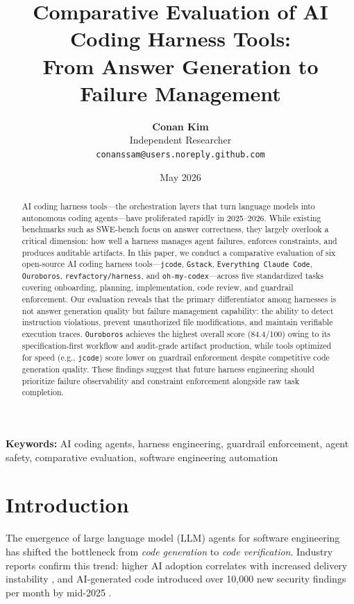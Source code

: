 \documentclass[11pt,a4paper]{article}
\title{\LARGE\bfseries Comparative Evaluation of AI Coding Harness Tools:\\[4pt]
\large From Answer Generation to Failure Management}
\author{
  \textbf{Conan Kim}\\[2pt]
  \small Independent Researcher\\
  \small \texttt{conanssam@users.noreply.github.com}
}
\date{May 2026}
\newcommand{\tool}[1]{\texttt{#1}}
\begin{document}
\maketitle

\begin{abstract}
AI coding harness tools---the orchestration layers that turn language models into autonomous coding agents---have proliferated rapidly in 2025--2026.
While existing benchmarks such as SWE-bench focus on answer correctness, they largely overlook a critical dimension: how well a harness manages agent failures, enforces constraints, and produces auditable artifacts.
In this paper, we conduct a comparative evaluation of six open-source AI coding harness tools---\tool{jcode}, \tool{Gstack}, \tool{Everything Claude Code}, \tool{Ouroboros}, \tool{revfactory/harness}, and \tool{oh-my-codex}---across five standardized tasks covering onboarding, planning, implementation, code review, and guardrail enforcement.
Our evaluation reveals that the primary differentiator among harnesses is not answer generation quality but failure management capability: the ability to detect instruction violations, prevent unauthorized file modifications, and maintain verifiable execution traces.
\tool{Ouroboros} achieves the highest overall score (84.4/100) owing to its specification-first workflow and audit-grade artifact production, while tools optimized for speed (e.g., \tool{jcode}) score lower on guardrail enforcement despite competitive code generation quality.
These findings suggest that future harness engineering should prioritize failure observability and constraint enforcement alongside raw task completion.
\end{abstract}

\noindent\textbf{Keywords:} AI coding agents, harness engineering, guardrail enforcement, agent safety, comparative evaluation, software engineering automation

\newpage
\tableofcontents
\newpage

\section{Introduction}
\label{sec:intro}

The emergence of large language model (LLM) agents for software engineering has shifted the bottleneck from \emph{code generation} to \emph{code verification}.
Industry reports confirm this trend: higher AI adoption correlates with increased delivery instability \cite{augment2026harness}, and AI-generated code introduced over 10,000 new security findings per month by mid-2025 \cite{augment2026harness}.
\end{document}

